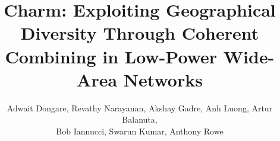 \documentclass[sigconf]{acmart}
\begin{document}






\title{ Charm: Exploiting Geographical Diversity Through Coherent Combining in Low-Power Wide-Area Networks }




\author{Adwait Dongare, Revathy Narayanan, Akshay Gadre, Anh Luong, Artur Balanuta, \\ Bob Iannucci, Swarun Kumar, Anthony Rowe }

\renewcommand{\shortauthors}{Dongare et al.}
\end{document}
